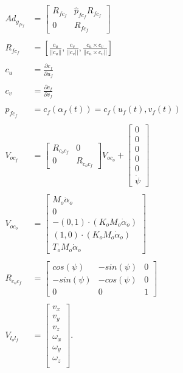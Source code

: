\documentclass[journal]{IEEEtran}
\begin{document}
\begin{align*}
Ad_{g_{fc_f}} &= \begin{bmatrix}
		R_{fc_f} & \hat{p}_{fc_f} R_{fc_f} \\
		0 & R_{fc_f}
              \end{bmatrix} \\ \\
R_{fc_f} &= \left[ \frac{c_u}{||c_u||}, \frac{c_v}{||c_v||}, \frac{c_u\times c_v}{||c_u\times c_v||}  \right] \\ \\
c_u &= \frac{\partial c_f}{\partial u_f} \\ \\
c_v &= \frac{\partial c_f}{\partial v_f}\\ \\
p_{fc_f} &= c_f(\alpha_f(t)) = c_f(u_f(t), v_f(t)) \\ \\
V_{oc_f} &=  \begin{bmatrix}
				R_{c_oc_f} & 0 \\
				0 & R_{c_oc_f}
			\end{bmatrix}
			V_{oc_o} +  \begin{bmatrix}
							0 \\
							0 \\
							0 \\
							0 \\
							0 \\
							\dot{\psi}
						\end{bmatrix} \\ \\
V_{oc_o} &=  \begin{bmatrix}
				M_o\dot{\alpha}_o \\
				0 \\
				-(0,1)\cdot(K_oM_o\dot{\alpha}_o) \\
				(1,0)\cdot(K_oM_o\dot{\alpha}_o) \\
				T_oM_o\dot{\alpha}_o
			\end{bmatrix} \\ \\
R_{c_oc_f} &= \begin{bmatrix}
				cos(\psi) & -sin(\psi) & 0 \\
				-sin(\psi) & -cos(\psi) & 0 \\
				0 & 0 & 1
			 \end{bmatrix} \\ \\
V_{l_ol_f} &= \begin{bmatrix}
				v_x \\
				v_y \\
				v_z \\
				\omega_x \\
				\omega_y \\
				\omega_z \\
			 \end{bmatrix}.
\end{align*}
\end{document}
